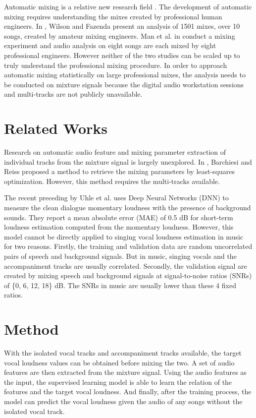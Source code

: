 \documentclass[conference]{IEEEtran}
\begin{document}
Automatic mixing is a relative new research field \cite{de2017ten} \cite{de2019intelligentmusic} \cite{moffat2019approaches}. The development of automatic mixing requires understanding the mixes created by professional human engineers. In \cite{wilson2016variation}, Wilson and Fazenda present an analysis of 1501 mixes, over 10 songs, created by amateur mixing engineers. Man et al. in \cite{man2014analysis} conduct a mixing experiment and audio analysis on eight songs are each mixed by eight professional engineers. However neither of the two studies can be scaled up to truly understand the professional mixing procedure. In order to approach automatic mixing statistically on large professional mixes, the analysis needs to be conducted on mixture signals because the digital audio workstation sessions and multi-tracks are not publicly unavailable.


\section{Related Works}

Research on automatic audio feature and mixing parameter extraction of individual tracks from the mixture signal is largely unexplored. In \cite{barchiesi2010reverse}, Barchiesi and Reiss proposed a method to retrieve the mixing parameters by least-squares optimization. However, this method requires the multi-tracks available. 

The recent preceding by Uhle et al. \cite{uhle2021clean} uses Deep Neural Networks (DNN) to measure the clean dialogue momentary loudness with the presence of background sounds. They report a mean absolute error (MAE) of  0.5 dB for short-term loudness estimation computed from the momentary loudness. However, this model cannot be directly applied to singing vocal loudness estimation in music for two reasons. Firstly, the training and validation data are random uncorrelated pairs of speech and background signals. But in music, singing vocals and the accompaniment tracks are usually correlated. Secondly, the validation signal are created by mixing speech and background signals at signal-to-noise ratios (SNRs) of \{0, 6, 12, 18\} dB. The SNRs in music are usually lower than these 4 fixed ratios.
\section{Method}

With the isolated vocal tracks and accompaniment tracks available, the target vocal loudness values can be obtained before mixing the two. A set of audio features are then extracted from the mixture signal. Using the audio features as the input, the supervised learning model is able to learn the relation of the features and the target vocal loudness. And finally, after the training process, the model can predict the vocal loudness given the audio of any songs without the isolated vocal track.
\end{document}
